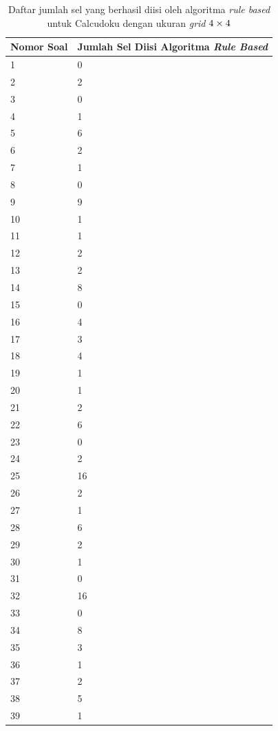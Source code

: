 \documentclass[11pt,a4paper,twoside,openright]{article}
\begin{document}
\begin{enumerate}
\begin{table}
\centering
\captionsetup{justification=centering}
\caption[Daftar jumlah sel yang berhasil diisi oleh algoritma \textit{rule based} untuk Calcudoku dengan ukuran \textit{grid} \protect\begin{math}4 \times 4\protect\end{math}]{Daftar jumlah sel yang berhasil diisi oleh algoritma \textit{rule based} untuk Calcudoku dengan ukuran \textit{grid} \protect\begin{math}4 \times 4\protect\end{math}}
\begin{tabular}{| l | l |}
\hline
Nomor Soal & Jumlah Sel Diisi Algoritma \textit{Rule Based} \\
\hline \hline
1 & 0 \\
\hline
2 & 2 \\
\hline
3 & 0 \\
\hline
4 & 1 \\
\hline
5 & 6 \\
\hline
6 & 2 \\
\hline
7 & 1 \\
\hline
8 & 0 \\
\hline
9 & 9 \\
\hline
10 & 1 \\
\hline
11 & 1 \\
\hline
12 & 2 \\
\hline
13 & 2 \\
\hline
14 & 8 \\
\hline
15 & 0 \\
\hline
16 & 4 \\
\hline
17 & 3 \\
\hline
18 & 4 \\
\hline
19 & 1 \\
\hline
20 & 1 \\
\hline
21 & 2 \\
\hline
22 & 6 \\
\hline
23 & 0 \\
\hline
24 & 2 \\
\hline
25 & 16 \\
\hline
26 & 2 \\
\hline
27 & 1 \\
\hline
28 & 6 \\
\hline
29 & 2 \\
\hline
30 & 1 \\
\hline
31 & 0 \\
\hline
32 & 16 \\
\hline
33 & 0 \\
\hline
34 & 8 \\
\hline
35 & 3 \\
\hline
36 & 1 \\
\hline
37 & 2 \\
\hline
38 & 5 \\
\hline
39 & 1 \\
\hline
\end{tabular}
\label{tab:tabel1}
\end{table}


\end{enumerate}
\end{document}
